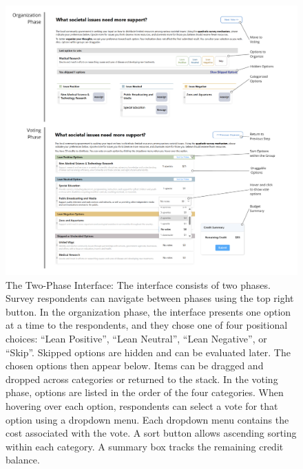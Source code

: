 \begin{figure}[ht]
    \centering
    \includegraphics[width=1\textwidth]{content/image/detailed.pdf}
    \caption{The Two-Phase Interface: The interface consists of two phases. Survey respondents can navigate between phases using the top right button. In the organization phase, the interface presents one option at a time to the respondents, and they chose one of four positional choices: ``Lean Positive'', ``Lean Neutral'', ``Lean Negative'', or ``Skip''. Skipped options are hidden and can be evaluated later. The chosen options then appear below. Items can be dragged and dropped across categories or returned to the stack. In the voting phase, options are listed in the order of the four categories. When hovering over each option, respondents can select a vote for that option using a dropdown menu. Each dropdown menu contains the cost associated with the vote. A sort button allows ascending sorting within each category. A summary box tracks the remaining credit balance.}
    \label{fig:interactiveInterface}
    \Description{
}
\end{figure}
